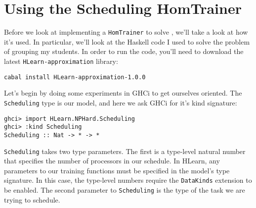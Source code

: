 \documentclass[tikz]{tmr}
\newcommand\h{\lstinline}
\newcommand{\prob}[1]{{\sc {#1}}}
\newcommand\+{\mdoubleplus}
\begin{document}
\section {Using the Scheduling HomTrainer}


Before we look at implementing a \h{HomTrainer} to solve \prob{Scheduling}, we'll take a look at how it's used.
In particular, we'll look at the Haskell code I used to solve the problem of grouping my students.
In order to run the code, you'll need to download the latest \h{HLearn-approximation} library:

\begin{lstlisting}
cabal install HLearn-approximation-1.0.0
\end{lstlisting}

Let's begin by doing some experiments in GHCi to get ourselves oriented.
The \h{Scheduling} type is our model, and here we ask GHCi for it's kind signature:
\begin{lstlisting}
ghci> import HLearn.NPHard.Scheduling
ghci> :kind Scheduling
Scheduling :: Nat -> * -> *
\end{lstlisting}
\h{Scheduling} takes two type parameters.
The first is a type-level natural number that specifies the number of processors in our schedule.
In HLearn, any parameters to our training functions must be specified in the model's type signature.
In this case, the type-level numbers require the \h{DataKinds} extension to be enabled.
The second parameter to \h{Scheduling} is the type of the task we are trying to schedule.
\end{document}
